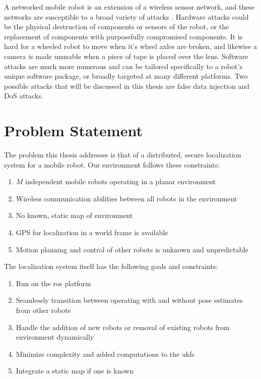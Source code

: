 \documentclass[thesis.tex]{subfile}
\begin{document}
A networked mobile robot is an extension of a wireless sensor network, and these networks are susceptible to a broad variety of attacks \cite{perrig2004security}. Hardware attacks could be the physical destruction of components or sensors of the robot, or the replacement of components with purposefully compromised components. It is hard for a wheeled robot to move when it's wheel axles are broken, and likewise a camera is made unusable when a piece of tape is placed over the lens. Software attacks are much more numerous and can be tailored specifically to a robot's unique software package, or broadly targeted at many different platforms. Two possible attacks that will be discussed in this thesis are false data injection and \gls{DoS} attacks.

\section{Problem Statement} \label{sec:Problem Statement}
The problem this thesis addresses is that of a distributed, secure localization system for a mobile robot. Our environment follows these constraints:
\begin{enumerate}
\item $M$ independent mobile robots operating in a planar environment
\item Wireless communication abilities between all robots in the environment
\item No known, static map of environment
\item GPS for localization in a world frame is available
\item Motion planning and control of other robots is unknown and unpredictable
\end{enumerate}

The localization system itself has the following goals and constraints:
\begin{enumerate}
\item Run on the \gls{ros} platform
\item Seamlessly transition between operating with and without pose estimates from other robots
\item Handle the addition of new robots or removal of existing robots from environment dynamically
\item Minimize complexity and added computations to the \glspl{ukf}
\item Integrate a static map if one is known
\end{enumerate}
\end{document}
